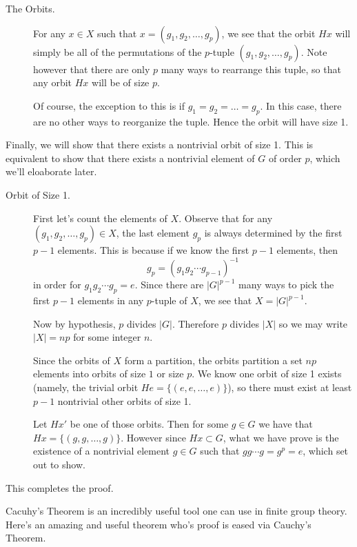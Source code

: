 \begin{prf}
        \begin{description}
            \item[The Orbits.] 
            For any $x \in X$ such that $x = (g_1, g_2, \dots, g_p)$,
            we see that the orbit $Hx$ will simply be all of
            the permutations of the $p$-tuple $(g_1, g_2, \dots,
            g_p)$. Note however that there are only $p$ many ways to
            rearrange this tuple, so that any orbit $Hx$ will be of
            size $p$.

            Of course, the exception to this is if $g_1 = g_2 = \dots = g_p$. In
            this case, there are no other ways to reorganize the
            tuple. Hence the orbit will have size 1.
        \end{description}

        \textcolor{NavyBlue}{Finally, we will show that there exists a
        nontrivial orbit of size 1. This is equivalent to show that
        there exists a nontrivial element of $G$ of order $p$, which
        we'll eloaborate later.}

        \begin{description}
            \item[Orbit of Size 1.]
            First let's count the elements of $X$. Observe that for
            any $(g_1, g_2, \dots, g_p) \in
            X$, the last element $g_p$ is always determined by the
            first $p-1$ elements. This is because if we know the first
            $p-1$ elements, then 
            \[
                g_p = (g_1g_2 \cdots g_{p-1})^{-1}
            \]
            in order for $g_1g_2\cdots g_p = e$. Since there are
            $|G|^{p-1}$ many ways to pick the first $p-1$ elements in
            any $p$-tuple of $X$, we see that $X = |G|^{p-1}$. 

            Now by hypothesis, $p$ divides $|G|$. Therefore $p$
            divides $|X|$ so we may write $|X| = np$ for some integer $n$.

            Since the orbits of $X$ form a partition, the orbits
            partition a set $np$ elements into orbits of size $1$ or
            size $p$. We know one orbit of size 1 exists (namely, the
            trivial orbit $He = \{(e, e, \dots, e)\}$), so there must
            exist at least $p-1$ nontrivial other orbits of size 1. 

            Let $Hx'$ be one of those orbits. Then for some $g \in G$
            we have that $Hx = \{(g, g, \dots, g)\}$. However since
            $Hx \subset G$, what we have prove is the existence of a
            nontrivial
            element $g \in G$ such that $gg\cdots g = g^p = e$, which
           set out to show.
        \end{description}
        This completes the proof.
    \end{prf}
    Cacuhy's Theorem is an incredibly useful tool one can use in
    finite group theory. Here's an amazing and useful theorem who's
    proof is eased via Cauchy's Theorem.

